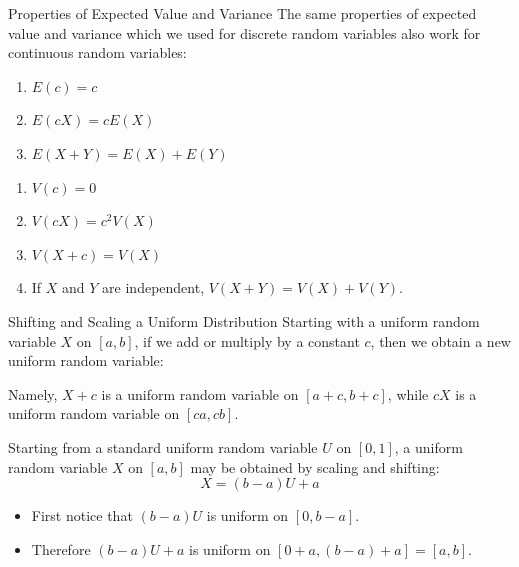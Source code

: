 \documentclass{beamer}
\begin{document}
\begin{frame}{Properties of Expected Value and Variance}
The same properties of expected value and variance which we used for discrete random variables also work for continuous random variables:
\begin{block}{}
\begin{enumerate}
\item $E(c) = c$
\item $E(cX) = cE(X)$
\item $E(X+Y) = E(X)+E(Y)$
\end{enumerate}
\end{block}

\begin{block}{}
\begin{enumerate}
\item $V(c) = 0$
\item $V(cX) = c^2V(X)$
\item $V(X+c) = V(X)$
\item If $X$ and $Y$ are independent, $V(X+Y)=V(X)+V(Y)$.
\end{enumerate}
\end{block}
\end{frame}

\begin{frame}{Shifting and Scaling a Uniform Distribution}
Starting with a uniform random variable $X$ on $[a,b]$, if we add or multiply by a constant $c$, then we obtain a new uniform random variable:

\vspace{.2cm}Namely, $X+c$ is a uniform random variable on $[a+c,b+c]$, while $cX$ is a uniform random variable on $[ca,cb]$.

\vspace{.2cm}\pause
Starting from a standard uniform random variable $U$ on $[0,1]$, a uniform random variable $X$ on $[a,b]$ may be obtained by scaling and shifting:
$$X=(b-a)U+a$$

\vspace{0cm}
\begin{itemize}
\item First notice that $(b-a)U$ is uniform on $[0,b-a]$.
\item Therefore $(b-a)U+a$ is uniform on $[0+a,(b-a)+a]=[a,b]$.
\end{itemize}
\end{frame}
\end{document}
